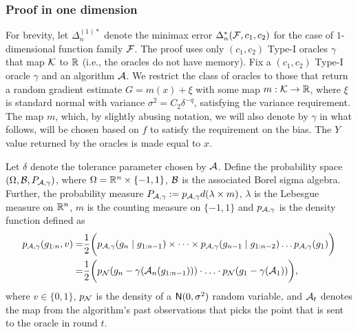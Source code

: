 \subsubsection{Proof in one dimension}
For brevity, let $\Delta_n^{(1)*}$ denote the minimax error $\Delta_n^*(\mathcal{F}, c_1,c_2)$ for the case of $1$-dimensional function family $\mathcal{F}$.
The proof uses only $(c_1,c_2)$ Type-I oracles $\gamma$ that map $\mathcal{K}$ to $\mathbb{R}$ (i.e., the oracles do not have memory).
Fix a  $(c_1,c_2)$ Type-I oracle $\gamma$ and an algorithm $\mathcal{A}$.
We restrict the class of oracles to those that return a random gradient estimate $G = m(x) + \xi$ with some map $m: \mathcal{K} \to \mathbb{R}$,
where $\xi$ is standard normal with variance $\sigma^2 = C_2 \delta^{-q}$, satisfying the variance requirement. 
The map $m$, which, by slightly abusing notation, we will also denote by $\gamma$ in what follows, will be chosen based on $f$ to satisfy the requirement on the bias. The $Y$ value returned by the oracles is made equal to $x$.

Let $\delta$ denote the tolerance parameter chosen by $\mathcal{A}$.
Define the probability space $(\Omega, \mathcal{B}, P_{\mathcal{A},\gamma})$, 
where $\Omega = \mathbb{R}^n\times \{-1,1\}$, $\mathcal{B}$ is the associated Borel sigma algebra. 
Further, the probability measure $P_{\mathcal{A},\gamma} := p_{\mathcal{A},\gamma} d(\lambda \times m)$, 
	$\lambda$ is the Lebesgue measure on $\mathbb{R}^n$, 
	$m$ is the counting measure on $\{-1,1\}$ and 
	$p_{\mathcal{A},\gamma}$ is the density function defined as
\begin{align*}
p_{\mathcal{A},\gamma}(g_{1:n}, v) = &\dfrac{1}{2} \bigg(p_{\mathcal{A},\gamma}(g_n \mid g_{1:n-1})\times \dots \times p_{\mathcal{A},\gamma }(g_{n-1} \mid g_{1:n-2}) \ldots p_{\mathcal{A},\gamma}(g_1)\bigg)\\
 = & \dfrac{1}{2} \bigg( p_{\mathcal{N}}(g_n - \gamma(\mathcal{A}_n(g_{1:n-1}))) \cdot
 \ldots \cdot  p_{\mathcal{N}}(g_1 - \gamma(\mathcal{A}_1))\bigg),
\end{align*}
where $v\in\{0,1\}$, $p_{\mathcal{N}}$ is the density of a $\mathsf{N}(0,\sigma^2)$ random variable,
and $\mathcal{A}_t$ denotes the map from the algorithm's past observations
that picks the point that is sent to the oracle in round $t$.


